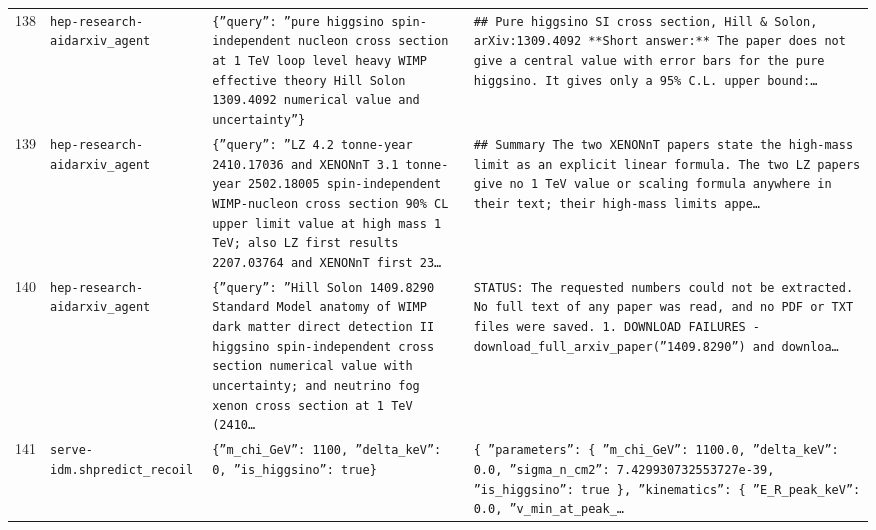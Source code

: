 \documentclass[11pt,a4paper]{article}
\begin{document}
\begin{longtable}{@{}p{}p{}p{}p{}@{}}
138 & \texttt{hep-research-aid}\newline\texttt{arxiv\_\allowbreak{}agent} & \texttt{\{''query'':\allowbreak{} ''pure higgsino spin-independent nucleon cross section at 1 TeV loop level heavy WIMP effective theory Hill Solon 1309.4092 numerical value and uncertainty''\}\allowbreak{}} & \texttt{\#\# Pure higgsino SI cross section,\allowbreak{} Hill \& Solon,\allowbreak{} arXiv:\allowbreak{}1309.4092  **Short answer:\allowbreak{}** The paper does not give a central value with error bars for the pure higgsino. It gives only a 95\% C.L. upper bound:\allowbreak{}\ldots{}\allowbreak{}} \\
139 & \texttt{hep-research-aid}\newline\texttt{arxiv\_\allowbreak{}agent} & \texttt{\{''query'':\allowbreak{} ''LZ 4.2 tonne-year 2410.17036 and XENONnT 3.1 tonne-year 2502.18005 spin-independent WIMP-nucleon cross section 90\% CL upper limit value at high mass 1 TeV;\allowbreak{} also LZ first results 2207.03764 and XENONnT first 23\ldots{}\allowbreak{}} & \texttt{\#\# Summary  The two XENONnT papers state the high-mass limit as an explicit linear formula. The two LZ papers give no 1 TeV value or scaling formula anywhere in their text;\allowbreak{} their high-mass limits appe\ldots{}\allowbreak{}} \\
140 & \texttt{hep-research-aid}\newline\texttt{arxiv\_\allowbreak{}agent} & \texttt{\{''query'':\allowbreak{} ''Hill Solon 1409.8290 Standard Model anatomy of WIMP dark matter direct detection II higgsino spin-independent cross section numerical value with uncertainty;\allowbreak{} and neutrino fog xenon cross section at 1 TeV (2410\ldots{}\allowbreak{}} & \texttt{STATUS:\allowbreak{} The requested numbers could not be extracted. No full text of any paper was read,\allowbreak{} and no PDF or TXT files were saved.  1. DOWNLOAD FAILURES - download\_\allowbreak{}full\_\allowbreak{}arxiv\_\allowbreak{}paper(''1409.8290'')\allowbreak{} and downloa\ldots{}\allowbreak{}} \\
141 & \texttt{serve-idm.sh}\newline\texttt{predict\_\allowbreak{}recoil} & \texttt{\{''m\_\allowbreak{}chi\_\allowbreak{}GeV'':\allowbreak{} 1100,\allowbreak{} ''delta\_\allowbreak{}keV'':\allowbreak{} 0,\allowbreak{} ''is\_\allowbreak{}higgsino'':\allowbreak{} true\}\allowbreak{}} & \texttt{\{   ''parameters'':\allowbreak{} \{     ''m\_\allowbreak{}chi\_\allowbreak{}GeV'':\allowbreak{} 1100.0,\allowbreak{}     ''delta\_\allowbreak{}keV'':\allowbreak{} 0.0,\allowbreak{}     ''sigma\_\allowbreak{}n\_\allowbreak{}cm2'':\allowbreak{} 7.429930732553727e-39,\allowbreak{}     ''is\_\allowbreak{}higgsino'':\allowbreak{} true   \}\allowbreak{},\allowbreak{}   ''kinematics'':\allowbreak{} \{     ''E\_\allowbreak{}R\_\allowbreak{}peak\_\allowbreak{}keV'':\allowbreak{} 0.0,\allowbreak{}     ''v\_\allowbreak{}min\_\allowbreak{}at\_\allowbreak{}peak\_\allowbreak{}\ldots{}\allowbreak{}} \\

\end{longtable}
\end{document}
